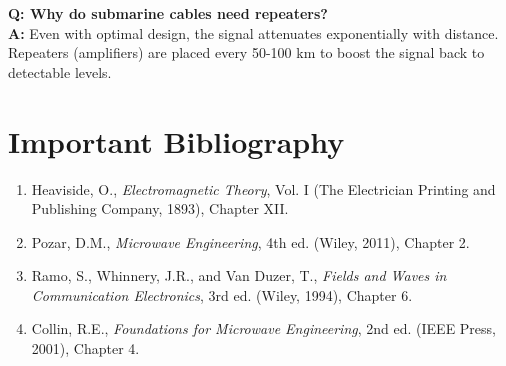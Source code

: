 \textbf{Q: Why do submarine cables need repeaters?}\\
\textbf{A:} Even with optimal design, the signal attenuates exponentially with distance. Repeaters (amplifiers) are placed every 50-100 km to boost the signal back to detectable levels.
\section*{Important Bibliography}

\begin{enumerate}
\item Heaviside, O., \textit{Electromagnetic Theory}, Vol. I (The Electrician Printing and Publishing Company, 1893), Chapter XII.
\item Pozar, D.M., \textit{Microwave Engineering}, 4th ed. (Wiley, 2011), Chapter 2.
\item Ramo, S., Whinnery, J.R., and Van Duzer, T., \textit{Fields and Waves in Communication Electronics}, 3rd ed. (Wiley, 1994), Chapter 6.
\item Collin, R.E., \textit{Foundations for Microwave Engineering}, 2nd ed. (IEEE Press, 2001), Chapter 4.
\end{enumerate}

